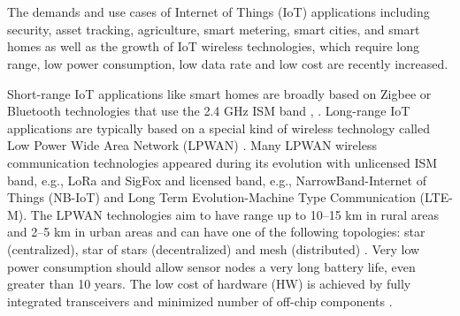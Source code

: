 \DIFdelbegin \section{}
\addtocounter{section}{-1}%
\DIFdelend \DIFaddbegin \chapter{}
\DIFaddend The demands and use cases of Internet of Things (IoT) applications including security, asset tracking, agriculture, smart metering, smart cities, and smart homes as well as the growth of IoT wireless technologies, which require long range, low power consumption, low data rate and low cost are recently increased.

Short-range IoT applications like smart homes are broadly based on Zigbee or Bluetooth technologies that use the 2.4 GHz ISM band \cite{Design and Implementation of an IoT Assisted Real Time ZigBee Mesh WSN}, \cite{Internet of Things (IoT) for building Smart Home System}.
Long-range IoT applications are typically based on a special kind of wireless technology called Low Power Wide Area Network (LPWAN) \cite{A comparative study of LPWAN technologies for large-scale IoTdeployment}. Many LPWAN wireless communication technologies appeared during its evolution with unlicensed ISM band, e.g., LoRa and SigFox and licensed band, e.g., NarrowBand-Internet of Things (NB-IoT) and Long Term Evolution-Machine Type Communication (LTE-M).
The LPWAN technologies aim to have range up to 10–15 km in rural areas and 2–5 km in urban areas \cite{Long-Range Communications in Unlicensed Bands} and can have one of the following topologies: star (centralized), star of stars (decentralized) and mesh (distributed) \cite{high density LPWAN}.
Very low power consumption should allow sensor nodes a very long battery life, even greater than 10 years.
The low cost of hardware (HW) is achieved by fully integrated transceivers and minimized number of off-chip components \cite{MURS Band for LPWAN Applications}.

